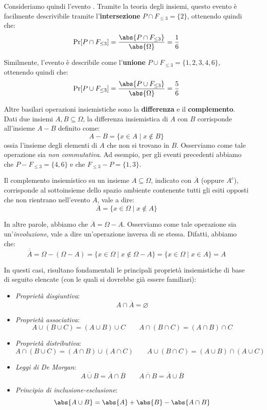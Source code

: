 \documentclass[a4paper, 12pt]{report}
\begin{document}
    Consideriamo quindi l'evento . Tramite la teoria degli insiemi, questo evento è facilmente descrivibile tramite l'\textbf{intersezione} $P \cap F_{\leq 3} = \{2\}$, ottenendo quindi che:
    \[\Pr[P \cap F_{\leq 3}] = \frac{\abs{P \cap F_{\leq 3}}}{\abs{\Omega}} = \frac{1}{6}\]

    Similmente, l'evento  è describile come l'\textbf{unione} $P \cup F_{\leq 3} = \{1,2,3,4,6\}$, ottenendo quindi che:
    \[\Pr[P \cup F_{\leq 3}] = \frac{\abs{P \cup F_{\leq 3}}}{\abs{\Omega}} = \frac{5}{6}\]


    Altre basilari operazioni insiemistiche sono la \textbf{differenza} e il \textbf{complemento}. Dati due insiemi $A, B \subseteq \Omega$, la differenza insiemistica di $A$ con $B$ corrisponde all'insieme $A-B$ definito come:
    \[A-B = \{x \in A \mid x \notin B\}\]
    ossia l'insieme degli elementi di $A$ che non si trovano in $B$. Osserviamo come tale operazione sia \textit{non commutativa}. Ad esempio, per gli eventi precedenti abbiamo che $P - F_{\leq 3} = \{4,6\}$ e che $F_{\leq 3} - P = \{1,3\}$.

    Il complemento insiemistico su un insieme $A \subseteq \Omega$, indicato con $\overline{A}$ (oppure $A^c$), corrisponde al sottoinsieme dello spazio ambiente contenente tutti gli esiti opposti che non rientrano nell'evento $A$, vale a dire:
    \[\overline{A} = \{x \in \Omega \mid x \notin A\}\]

    In altre parole, abbiamo che $\overline{A} = \Omega -A$. Osserviamo come tale operazione sia un'\textit{involuzione}, vale a dire un'operazione inversa di se stessa. Difatti, abbiamo che:
    \[\overline{\overline{A}} = \Omega - (\Omega - A) = \{x \in \Omega \mid x \notin \Omega - A\} = \{x \in \Omega \mid x \in A\} = A\]

    In questi casi, risultano fondamentali le principali proprietà insiemistiche di base di seguito elencate (con le quali si dovrebbe già essere familiari):
    \begin{itemize}
        \item \textit{Proprietà disgiuntiva}:
        \[A \cap \overline{A} = \varnothing\]
        \item \textit{Proprietà associativa}: 
        \[A \cup (B \cup C) = (A \cup B) \cup C \qquad A \cap (B \cap C) = (A \cap B) \cap C\]
        \item \textit{Proprietà distributiva}: 
        \[A \cap (B \cup C) = (A \cap B) \cup (A \cap C) \qquad A \cup (B \cap C) = (A \cup B) \cap (A \cup C)\]
        \item \textit{Leggi di De Morgan}:
        \[\overline{A \cup B} = \overline{A} \cap \overline{B} \qquad \overline{A \cap B} = \overline{A} \cup \overline{B}\]
        \item \textit{Principio di inclusione-esclusione}:
        \[\abs{A \cup B} = \abs{A} + \abs{B} - \abs{A \cap B}\]
    \end{itemize}
\end{document}
